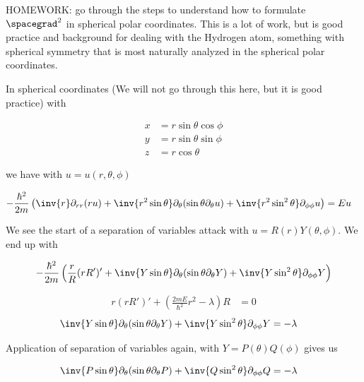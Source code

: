 %
%
HOMEWORK: go through the steps to understand how to formulate $\spacegrad^2$ in spherical polar coordinates.  This is a lot of work, but is good practice and background for dealing with the Hydrogen atom, something with spherical symmetry that is most naturally analyzed in the spherical polar coordinates.

In spherical coordinates (We will not go through this here, but it is good practice) with

\begin{align*}
x &= r \sin\theta \cos\phi \\
y &= r \sin\theta \sin\phi \\
z &= r \cos\theta
\end{align*}

we have with $u = u(r,\theta, \phi)$

\begin{align*}
-\frac{\hbar^2}{2m} \left(
\inv{r} \partial_{rr} (r u) +  \inv{r^2 \sin\theta} \partial_\theta (\sin\theta \partial_\theta u)
+ \inv{r^2 \sin^2\theta} \partial_{\phi\phi} u
 \right)
&= E u
\end{align*}

We see the start of a separation of variables attack with $u = R(r) Y(\theta, \phi)$.  We end up with

\begin{align*}
-\frac{\hbar^2}{2m} &\left(
\frac{r}{R} (r R')' +  \inv{Y \sin\theta} \partial_\theta (\sin\theta \partial_\theta Y)
+ \inv{Y \sin^2\theta} \partial_{\phi\phi} Y
 \right) \\
\end{align*}

\begin{align*}
r (r R')' + \left( \frac{2m E}{\hbar^2} r^2 - \lambda \right) R &= 0
\end{align*}
\begin{align*}
\inv{Y \sin\theta} \partial_\theta (\sin\theta \partial_\theta Y) + \inv{Y \sin^2\theta} \partial_{\phi\phi} Y &= -\lambda
\end{align*}

Application of separation of variables again, with $Y = P(\theta) Q(\phi)$ gives us

\begin{align*}
\inv{P \sin\theta} \partial_\theta (\sin\theta \partial_\theta P) + \inv{Q \sin^2\theta} \partial_{\phi\phi} Q &= -\lambda
\end{align*}

